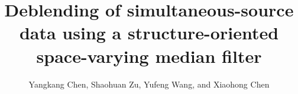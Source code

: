   
\title{Deblending of simultaneous-source data using a structure-oriented space-varying median filter}
\renewcommand{\thefootnote}{\fnsymbol{footnote}}

\author{Yangkang Chen\footnotemark[1], Shaohuan Zu\footnotemark[2]\footnotemark[3], Yufeng Wang\footnotemark[3], and Xiaohong Chen\footnotemark[3]}
\address{
\footnotemark[1]
School of Earth Sciences\\
Zhejiang University\\
Hangzhou, Zhejiang Province, China, 310027\\
chenyk2016@gmail.com\\
\footnotemark[2] Modeling and Imaging Laboratory\\
Earth and Planetary Sciences\\
University of California\\
Santa Cruz, CA 95064\\
zushaohuan@qq.com\\
\footnotemark[3]State Key Laboratory of Petroleum Resources and Prospecting \\
China University of Petroleum \\
Fuxue Road 18th\\
Beijing, China, 102200 \\
hellowangyf@163.com \& chenxh@cup.edu.cn \\
}

\maketitle

\DeclareRobustCommand{\dlo}[1]{}
\DeclareRobustCommand{\wen}[1]{#1}


